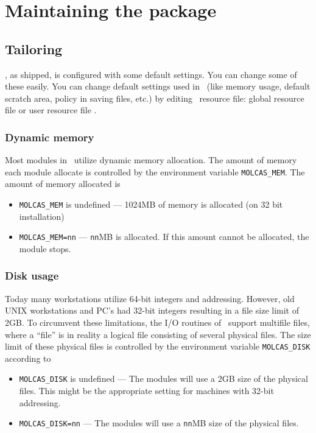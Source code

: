
\chapter{Maintaining the package}

\section{Tailoring}

\molcas, as shipped, is configured with some default settings. You can change
some of these easily.
You can change default settings used in \molcas\ (like memory usage, default
scratch area, policy in saving files, etc.)
by editing \molcas\ resource file: global resource file  or 
user resource file .

\subsection{\label{sec:dynamic_memory}Dynamic memory}

Most modules in \molcas\ utilize dynamic memory allocation. The amount of
memory each module allocate is controlled by the environment variable
{\tt MOLCAS\_MEM}. The amount of memory allocated is
\begin{itemize}
  \item {\tt MOLCAS\_MEM} is undefined --- 1024MB of memory is allocated
  (on 32 bit installation)
  \item {\tt MOLCAS\_MEM=nn} --- {\tt nn}MB is allocated.
    If this amount cannot be allocated, the module stops.
\end{itemize}


\subsection{\label{sec:disk_usage}Disk usage}

Today many workstations utilize 64-bit integers
and addressing. However, old UNIX workstations and PC's had 32-bit integers
resulting in a file size limit of 2GB.
To circumvent these limitations, the I/O routines
of \molcas\ support multifile files, where a ``file'' is in reality a
logical file consisting of several physical files. The size limit of
these physical files is controlled by the environment variable
{\tt MOLCAS\_DISK} according to
\begin{itemize}
\item {\tt MOLCAS\_DISK} is undefined --- The modules will use a 2GB size of the
  physical files. This might be the appropriate setting for machines
  with 32-bit addressing.
\item {\tt MOLCAS\_DISK=nn} --- The modules will use a {\tt nn}MB size
  of the physical files. 
\end{itemize}

